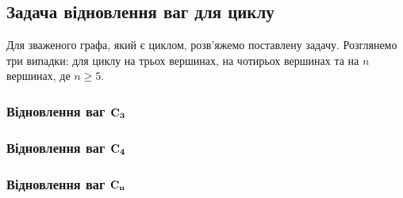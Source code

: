 \subsection{Задача відновлення ваг для циклу}
Для зваженого графа, який є циклом, розв'яжемо поставлену задачу. Розглянемо три випадки: для циклу на трьох вершинах, на чотирьох вершинах та на $n$ вершинах, де $n \geq 5$.
\subsubsection{Відновлення ваг ${\bf C_3}$}

\subsubsection{Відновлення ваг ${\bf C_4}$}

\subsubsection{Відновлення ваг ${\bf C_n}$}

